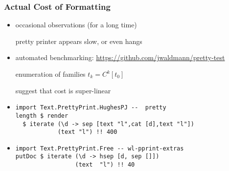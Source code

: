 \begin{frame}[fragile]
\frametitle{Actual Cost of Formatting}

\begin{itemize}%
\item occasional observations (for a long time)

  pretty printer appears slow, or even hangs
\item 
  automated benchmarking:  
  \url{https://github.com/jwaldmann/pretty-test}

  enumeration of families $t_k=C^k[t_0]$ 

  suggest that cost is super-linear

\item 
\begin{small}
\begin{verbatim}
import Text.PrettyPrint.HughesPJ --  pretty
length $ render 
  $ iterate (\d -> sep [text "l",cat [d],text "l"]) 
            (text "l") !! 400
\end{verbatim}
\end{small}
\item 
\begin{small}
\begin{verbatim}
import Text.PrettyPrint.Free -- wl-pprint-extras
putDoc $ iterate (\d -> hsep [d, sep []]) 
                 (text  "l") !! 40
\end{verbatim}
\end{small}
\end{itemize}


\end{frame}
